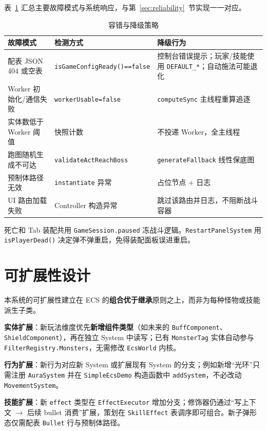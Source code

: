 表~\ref{tab:fault-tolerance} 汇总主要故障模式与系统响应，与第~\ref{sec:reliability}~节实现一一对应。

\begin{table}[htbp]
  \centering
  \caption{容错与降级策略}
  \label{tab:fault-tolerance}
  \begin{tabular}{p{3.2cm}p{4.0cm}p{5.8cm}}
    \toprule
    \textbf{故障模式} & \textbf{检测方式} & \textbf{降级行为} \\
    \midrule
    配表 JSON 404 或空表 & \texttt{isGameConfigReady()==false} & 控制台错误提示；玩家/技能使用 \texttt{DEFAULT\_*}；自动施法可能退化 \\
    Worker 初始化/通信失败 & \texttt{workerUsable=false} & \texttt{computeSync} 主线程重算追逐 \\
    实体数低于 Worker 阈值 & 快照计数 & 不投递 Worker，全主线程 \\
    跑图随机生成不可达 & \texttt{validateActReachBoss} & \texttt{generateFallback} 线性保底图 \\
    预制体路径无效 & \texttt{instantiate} 异常 & 占位节点 + 日志 \\
    UI 路由加载失败 & Controller 构造异常 & 跳过该路由并日志，不阻断战斗容器 \\
  \bottomrule
  \end{tabular}
\end{table}

死亡和 Tab 装配共用 \texttt{GameSession.paused} 冻战斗逻辑。\texttt{RestartPanelSystem} 用 \texttt{isPlayerDead()} 决定弹不弹重启，免得装配面板误进重启。

\section{可扩展性设计}
\label{sec:extensibility}

本系统的可扩展性建立在 ECS 的\textbf{组合优于继承}原则之上，而非为每种怪物或技能派生子类。

\textbf{实体扩展}：新玩法维度优先\textbf{新增组件类型}（如未来的 \texttt{BuffComponent}、\texttt{ShieldComponent}），再在独立 System 中读写；已有 \texttt{MonsterTag} 实体自动参与 \texttt{FilterRegistry.Monsters}，无需修改 \texttt{EcsWorld} 内核。

\textbf{行为扩展}：新行为对应新 System 或扩展现有 System 的分支；例如新增“光环”只需注册 \texttt{AuraSystem} 并在 \texttt{SimpleEcsDemo} 构造函数中 \texttt{addSystem}，不必改动 \texttt{MovementSystem}。

\textbf{技能扩展}：新 \texttt{effect} 类型在 \texttt{EffectExecutor} 增加分支；修饰器仍通过“写上下文 $\rightarrow$ 后续 bullet 消费”扩展，策划在 \texttt{SkillEffect} 表调序即可组合。新子弹形态仅需配表 \texttt{Bullet} 行与预制体路径。

